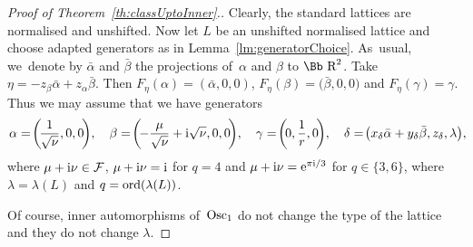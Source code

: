 \documentclass[10pt,a4paper]{amsart}
\newcommand\RR{{\mbox{\Bb R}}}
\newcommand\cF{{\mathcal F}}
\newcommand{\Osc}{{\rm Osc}}
\newcommand{\ord}{{\rm ord}}
\numberwithin{equation}{section}
\begin{document}
\begin{proof}[Proof of Theorem~\ref{th:classUptoInner}.]
Clearly, the standard lattices are normalised and unshifted. Now let $L$ be an unshifted normalised lattice and choose adapted generators as in Lemma~\ref{lm:generatorChoice}. As~usual, we~denote by $\bar \alpha$ and $\bar \beta$ the projections of~$\alpha$ and $\beta$ to $\RR^2$.
Take $\eta=-z_\beta\bar\alpha+z_\alpha\bar\beta$. Then $F_{\eta}(\alpha)=(\bar\alpha,0,0)$, $F_{\eta}(\beta)=\big(\bar\beta,0,0\big)$ and $F_{\eta}(\gamma)=\gamma$. Thus we may assume that we have generators
\begin{gather}\label{choice2}
\alpha=\!\bigg(\!\frac 1{\sqrt\nu},0,0\!\bigg),\quad
\beta=\!\bigg(\!{-}\frac{\mu}{\sqrt\nu}+{\rm i}\sqrt\nu,0,0\!\bigg),\quad
\gamma=\!\bigg(\!0,\frac 1r,0\!\bigg),\quad
\delta=\!\big(x_\delta\bar\alpha+y_\delta\bar\beta,z_\delta,\lambda\big),\!\!
\end{gather}
where $\mu+{\rm i}\nu\in\cF$, $\mu+{\rm i}\nu={\rm i}$ for $q=4$ and $\mu+{\rm i}\nu= {\rm e}^{\pi {\rm i}/3}$ for $q\in\{3,6\}$, where $\lambda=\lambda(L)$ and $q=\ord(\lambda(L))$.

Of course, inner automorphisms of~$\Osc_1$ do not change the type of the lattice and they do not change $\lambda$.


\end{proof}
\end{document}
